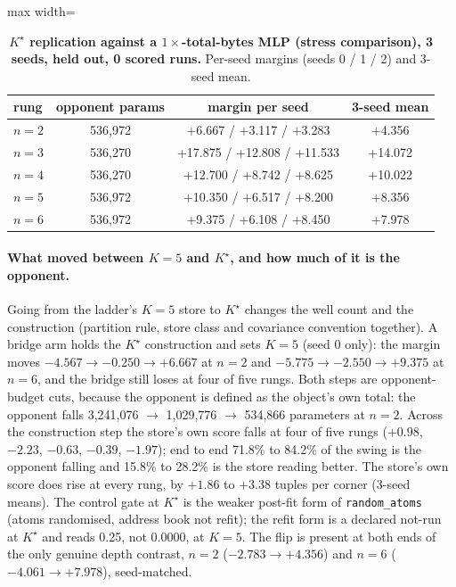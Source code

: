 \documentclass{article}
\newcommand{\Kstar}{\ensuremath{K^{\star}}}
\begin{document}
\begin{table}[h]
\centering\small
\caption{\textbf{$\Kstar$ replication against a $1\times$-total-bytes MLP (stress comparison),
3 seeds, held out, 0 scored runs.} Per-seed margins (seeds 0 / 1 / 2) and 3-seed mean.}
\label{tab:1x}
\begin{adjustbox}{max width=\linewidth}\begin{tabular}{lccc}
\toprule
rung & opponent params & margin per seed & 3-seed mean \\
\midrule
$n=2$ & 536,972 & +6.667 / +3.117 / +3.283 & +4.356 \\
$n=3$ & 536,270 & +17.875 / +12.808 / +11.533 & +14.072 \\
$n=4$ & 536,270 & +12.700 / +8.742 / +8.625 & +10.022 \\
$n=5$ & 536,972 & +10.350 / +6.517 / +8.200 & +8.356 \\
$n=6$ & 536,972 & +9.375 / +6.108 / +8.450 & +7.978 \\
\bottomrule
\end{tabular}\end{adjustbox}
\end{table}

\paragraph{What moved between $K=5$ and $\Kstar$, and how much of it is the opponent.} Going from
the ladder's $K=5$ store to $\Kstar$ changes the well count and the construction (partition rule,
store class and covariance convention together). A bridge arm holds the $\Kstar$ construction and
sets $K=5$ (seed 0 only): the margin moves $-4.567\to-0.250\to+6.667$ at $n=2$ and
$-5.775\to-2.550\to+9.375$ at $n=6$, and the bridge still loses at four of five rungs.
Both steps are opponent-budget cuts, because the opponent is defined as the object's own total: the
opponent falls 3,241,076 $\to$ 1,029,776 $\to$ 534,866 parameters at $n=2$. Across the construction
step the store's own score falls at four of five rungs ($+0.98$, $-2.23$, $-0.63$, $-0.39$, $-1.97$);
end to end 71.8\% to 84.2\% of the swing is the opponent falling and 15.8\% to 28.2\% is the store
reading better.
The store's own score does rise at every rung, by $+1.86$ to $+3.38$ tuples per corner (3-seed
means).
The control gate at $\Kstar$ is the weaker post-fit form of \texttt{random\_atoms} (atoms
randomised, address book not refit); the refit form is a declared not-run at $\Kstar$ and reads
0.25, not 0.0000, at $K=5$.
The flip is present at both ends of the only genuine depth contrast, $n=2$ ($-2.783\to+4.356$) and
$n=6$ ($-4.061\to+7.978$), seed-matched.
\end{document}
